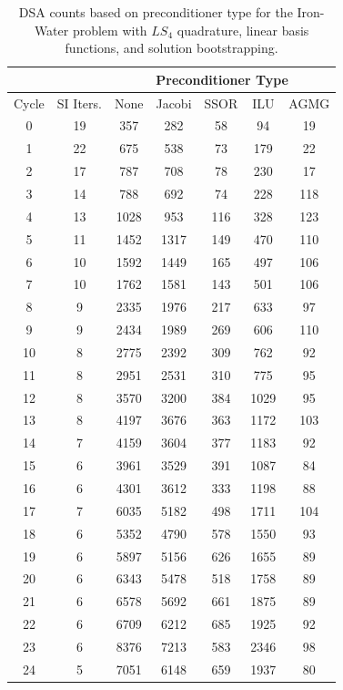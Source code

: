 \begin{table}
\caption{DSA counts based on preconditioner type for the Iron-Water problem with $LS_4$ quadrature, linear basis functions, and solution bootstrapping.}
\begin{center}
\def\arraystretch{1.25}
\begin{tabular}{|c|c|c|c|c|c|c|}
\hline
& & \multicolumn{5}{c}{Preconditioner Type}\vline\\
\hline
Cycle & SI Iters. & None&Jacobi&SSOR& ILU& AGMG \\
\hline
0&19&357&282&58&94&19\\
1&22&675&538&73&179&22\\
2&17&787&708&78&230&17\\
3&14&788&692&74&228&118\\
4&13&1028&953&116&328&123\\
5&11&1452&1317&149&470&110\\
6&10&1592&1449&165&497&106\\
7&10&1762&1581&143&501&106\\
8&9&2335&1976&217&633&97\\
9&9&2434&1989&269&606&110\\
10&8&2775&2392&309&762&92\\
11&8&2951&2531&310&775&95\\
12&8&3570&3200&384&1029&95\\
13&8&4197&3676&363&1172&103\\
14&7&4159&3604&377&1183&92\\
15&6&3961&3529&391&1087&84\\
16&6&4301&3612&333&1198&88\\
17&7&6035&5182&498&1711&104\\
18&6&5352&4790&578&1550&93\\
19&6&5897&5156&626&1655&89\\
20&6&6343&5478&518&1758&89\\
21&6&6578&5692&661&1875&89\\
22&6&6709&6212&685&1925&92\\
23&6&8376&7213&583&2346&98\\
24&5&7051&6148&659&1937&80\\
\hline
\end{tabular}
\end{center}
\label{tab::DSA_IW_LS4_k1_boot}
\end{table}

